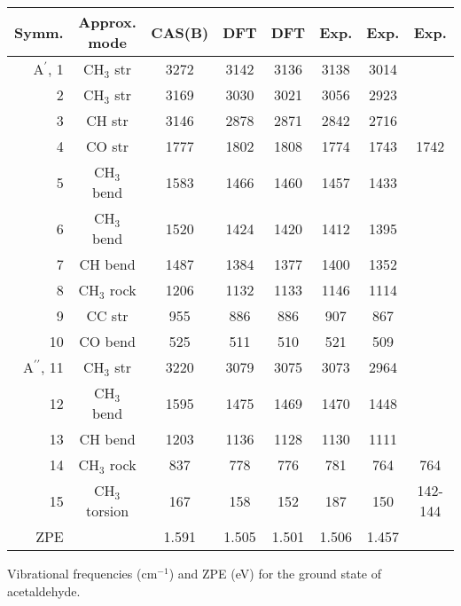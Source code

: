 \begin{center}
\begin{threeparttable}
\footnotesize
\begin{tabular*}{\textwidth}{r@{\hspace*{10mm}}ccccccc}
\hline
Symm. & Approx. mode & CAS(B)\tnote{a} & DFT\tnote{b} & DFT\tnote{c}
                     & Exp.\tnote{d} & Exp.\tnote{e} &Exp.\\
\hline
A$^\prime$, 1 & CH$_3$ str     & 3272 & 3142 & 3136 & 3138 & 3014  & \\
            2 & CH$_3$ str     & 3169 & 3030 & 3021 & 3056 & 2923  & \\
            3 & CH     str     & 3146 & 2878 & 2871 & 2842 & 2716  & \\
            4 & CO str         & 1777 & 1802 & 1808 & 1774 & 1743  &
1742\tnote{f}\\
            5 & CH$_3$ bend    & 1583 & 1466 & 1460 & 1457 & 1433  & \\
            6 & CH$_3$ bend    & 1520 & 1424 & 1420 & 1412 & 1395  & \\
            7 & CH     bend    & 1487 & 1384 & 1377 & 1400 & 1352  & \\
            8 & CH$_3$ rock    & 1206 & 1132 & 1133 & 1146 & 1114  & \\
            9 & CC str         &  955 &  886 &  886 &  907 &  867  & \\
           10 & CO bend        &  525 &  511 &  510 &  521 &  509  & \\
A$^{\prime\prime}$,                                           
           11 & CH$_3$ str     & 3220 & 3079 & 3075 & 3073 & 2964  & \\
           12 & CH$_3$ bend    & 1595 & 1475 & 1469 & 1470 & 1448  & \\
           13 & CH bend        & 1203 & 1136 & 1128 & 1130 & 1111  & \\
           14 & CH$_3$ rock    &  837 &  778 &  776 &  781 &  764  & 764\tnote{f} \\
           15 & CH$_3$ torsion &  167 &  158 &  152 &  187 &  150  & 142-144\tnote{g} \\
\hline                                                   
   ZPE        &                &1.591 &1.505 &1.501 &1.506 &1.457  & \\ \hline
\end{tabular*}
\caption{\footnotesize Vibrational frequencies (cm$^{-1}$) and ZPE (eV)
for the ground state of acetaldehyde.
}\label{tbl:vibra_aceta}

\end{threeparttable}
\end{center}
